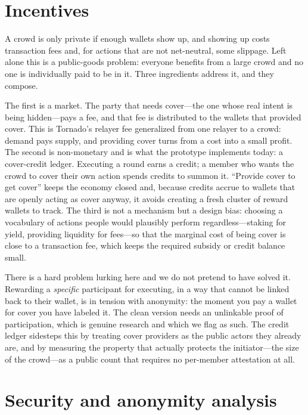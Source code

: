 \documentclass[11pt]{article}
\begin{document}
\section{Incentives}
\label{sec:incentives}

A crowd is only private if enough wallets show up, and showing up costs
transaction fees and, for actions that are not net-neutral, some slippage. Left
alone this is a public-goods problem: everyone benefits from a large crowd and no
one is individually paid to be in it. Three ingredients address it, and they
compose.

The first is a market. The party that needs cover---the one whose real intent is
being hidden---pays a fee, and that fee is distributed to the wallets that
provided cover. This is Tornado's relayer fee generalized from one relayer to a
crowd: demand pays supply, and providing cover turns from a cost into a small
profit. The second is non-monetary and is what the prototype implements today: a
cover-credit ledger. Executing a round earns a credit; a member who wants the
crowd to cover their own action spends credits to summon it. ``Provide cover to
get cover'' keeps the economy closed and, because credits accrue to wallets that
are openly acting as cover anyway, it avoids creating a fresh cluster of reward
wallets to track. The third is not a mechanism but a design bias: choosing a
vocabulary of actions people would plausibly perform regardless---staking for
yield, providing liquidity for fees---so that the marginal cost of being cover is
close to a transaction fee, which keeps the required subsidy or credit balance
small.

There is a hard problem lurking here and we do not pretend to have solved it.
Rewarding a \emph{specific} participant for executing, in a way that cannot be
linked back to their wallet, is in tension with anonymity: the moment you pay a
wallet for cover you have labeled it. The clean version needs an unlinkable proof
of participation, which is genuine research and which we flag as such. The
credit ledger sidesteps this by treating cover providers as the public actors
they already are, and by measuring the property that actually protects the
initiator---the size of the crowd---as a public count that requires no per-member
attestation at all.

\section{Security and anonymity analysis}
\label{sec:security}
\end{document}
